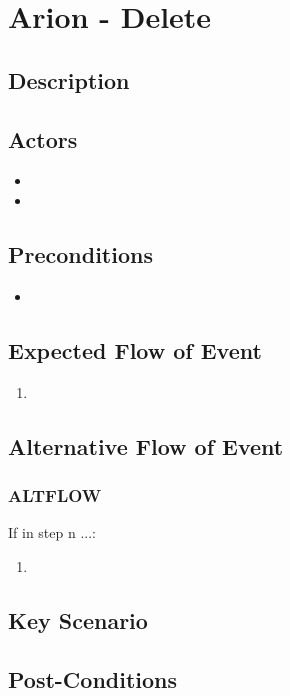 \documentclass{scrreprt}
\begin{document}
\chapter*{Arion - Delete}

\section*{Description}

\section*{Actors}
\begin{itemize}
    \item 
    \item 
\end{itemize}

\section*{Preconditions}
\begin{itemize}
    \item 
\end{itemize}

\section*{Expected Flow of Event}
\begin{enumerate}[1.]
    \item 
\end{enumerate}

\section*{Alternative Flow of Event}
\subsection*{ALTFLOW}
If in step n ...:
\begin{enumerate}
    \item 
\end{enumerate}

\section*{Key Scenario}

\section*{Post-Conditions}
\end{document}
